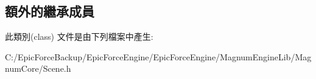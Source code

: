 \subsection*{額外的繼承成員}


此類別(class) 文件是由下列檔案中產生\+:\begin{DoxyCompactItemize}
\item 
C\+:/\+Epic\+Force\+Backup/\+Epic\+Force\+Engine/\+Epic\+Force\+Engine/\+Magnum\+Engine\+Lib/\+Magnum\+Core/Scene.\+h\end{DoxyCompactItemize}
